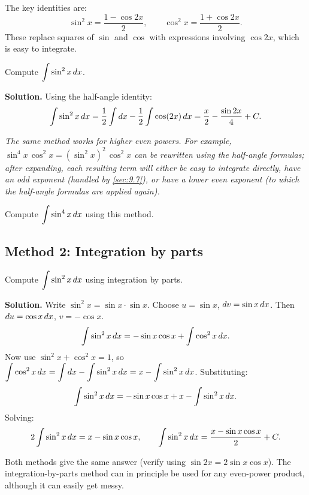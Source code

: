 The key identities are:
\[
  \sin^{2}x = \frac{1 - \cos 2x}{2}, \qquad \cos^{2}x = \frac{1 + \cos 2x}{2}.
\]
These replace squares of $\sin$ and $\cos$ with expressions involving $\cos 2x$, which is easy to integrate.

\begin{example}
\label{ex:9-14}
Compute $\displaystyle\int \sin^{2}x\,dx$.

\textbf{Solution.}  Using the half-angle identity:
\[
  \int \sin^{2}x\,dx = \frac{1}{2}\int dx - \frac{1}{2}\int \cos(2x)\,dx = \frac{x}{2} - \frac{\sin 2x}{4} + C.
\]
\end{example}

\textit{The same method works for higher even powers.  For example, $\sin^{4}x\,\cos^{2}x = (\sin^{2}x)^{2}\,\cos^{2}x$ can be rewritten using the half-angle formulas; after expanding, each resulting term will either be easy to integrate directly, have an odd exponent (handled by \cref{sec:9.7}), or have a lower even exponent (to which the half-angle formulas are applied again).}

\begin{remark}
Compute $\displaystyle\int \sin^{4}x\,dx$ using this method.
\end{remark}

\subsection*{Method 2: Integration by parts}

\begin{example}
\label{ex:9-15}
Compute $\displaystyle\int \sin^{2}x\,dx$ using integration by parts.

\textbf{Solution.}  Write $\sin^{2}x = \sin x \cdot \sin x$.  Choose $u = \sin x$, $dv = \sin x\,dx$.  Then $du = \cos x\,dx$, $v = -\cos x$.
\[
  \int \sin^{2}x\,dx = -\sin x\cos x + \int \cos^{2}x\,dx.
\]
Now use $\sin^{2}x + \cos^{2}x = 1$, so $\displaystyle\int \cos^{2}x\,dx = \int dx - \int \sin^{2}x\,dx = x - \int \sin^{2}x\,dx$.  Substituting:
\[
  \int \sin^{2}x\,dx = -\sin x\cos x + x - \int \sin^{2}x\,dx.
\]
Solving:
\[
  2\int \sin^{2}x\,dx = x - \sin x\cos x, \qquad \int \sin^{2}x\,dx = \frac{x - \sin x\cos x}{2} + C.
\]
\end{example}

\begin{remark}
Both methods give the same answer (verify using $\sin 2x = 2\sin x\cos x$).  The integration-by-parts method can in principle be used for any even-power product, although it can easily get messy.
\end{remark}

